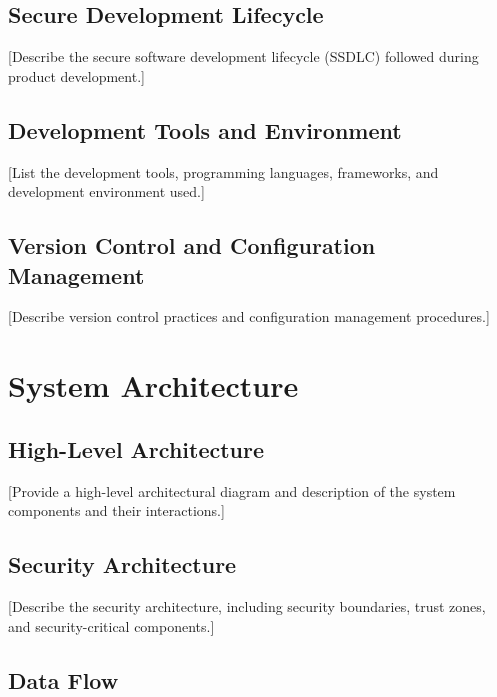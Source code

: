 \documentclass[
  11 pt,
  a4paper,
  table]{report}
\begin{document}
\subsection{Secure Development
Lifecycle}\label{secure-development-lifecycle}

{[}Describe the secure software development lifecycle (SSDLC) followed
during product development.{]}

\subsection{Development Tools and
Environment}\label{development-tools-and-environment}

{[}List the development tools, programming languages, frameworks, and
development environment used.{]}

\subsection{Version Control and Configuration
Management}\label{version-control-and-configuration-management}

{[}Describe version control practices and configuration management
procedures.{]}

\section{System Architecture}\label{system-architecture}

\subsection{High-Level Architecture}\label{high-level-architecture}

{[}Provide a high-level architectural diagram and description of the
system components and their interactions.{]}

\subsection{Security Architecture}\label{security-architecture}

{[}Describe the security architecture, including security boundaries,
trust zones, and security-critical components.{]}

\subsection{Data Flow}\label{data-flow}
\end{document}

